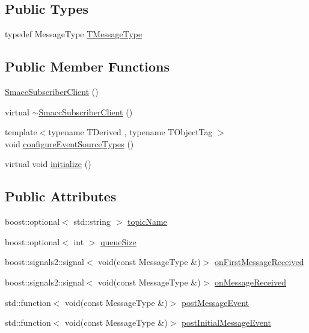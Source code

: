 \subsection*{Public Types}
\begin{DoxyCompactItemize}
\item 
typedef Message\+Type \hyperlink{classsmacc_1_1SmaccSubscriberClient_ae0666debefce5c0e7b355ded711ffa79}{T\+Message\+Type}
\end{DoxyCompactItemize}
\subsection*{Public Member Functions}
\begin{DoxyCompactItemize}
\item 
\hyperlink{classsmacc_1_1SmaccSubscriberClient_a864c5e7a7d267428e971d39b08a75066}{Smacc\+Subscriber\+Client} ()
\item 
virtual \hyperlink{classsmacc_1_1SmaccSubscriberClient_a1cff9c8ba162decf72b951c9e3459b7c}{$\sim$\+Smacc\+Subscriber\+Client} ()
\item 
{\footnotesize template$<$typename T\+Derived , typename T\+Object\+Tag $>$ }\\void \hyperlink{classsmacc_1_1SmaccSubscriberClient_a6bf5d364bc7dc89c4e2ff4796c8e4b63}{configure\+Event\+Source\+Types} ()
\item 
virtual void \hyperlink{classsmacc_1_1SmaccSubscriberClient_acfa97685ecc588fe61eb57002354b58a}{initialize} ()
\end{DoxyCompactItemize}
\subsection*{Public Attributes}
\begin{DoxyCompactItemize}
\item 
boost\+::optional$<$ std\+::string $>$ \hyperlink{classsmacc_1_1SmaccSubscriberClient_ac062907e834aa8e4ca7964fe2035edf7}{topic\+Name}
\item 
boost\+::optional$<$ int $>$ \hyperlink{classsmacc_1_1SmaccSubscriberClient_ac8d4905509ecacb7c93d72c9acb9b6a1}{queue\+Size}
\item 
boost\+::signals2\+::signal$<$ void(const Message\+Type \&)$>$ \hyperlink{classsmacc_1_1SmaccSubscriberClient_a2927ee2e390f12000379c9f48ddb7695}{on\+First\+Message\+Received}
\item 
boost\+::signals2\+::signal$<$ void(const Message\+Type \&)$>$ \hyperlink{classsmacc_1_1SmaccSubscriberClient_a7635fbb013c6fdbc3998da11b44766bb}{on\+Message\+Received}
\item 
std\+::function$<$ void(const Message\+Type \&)$>$ \hyperlink{classsmacc_1_1SmaccSubscriberClient_ac131b24d58ff06791068f8dfd3401a0b}{post\+Message\+Event}
\item 
std\+::function$<$ void(const Message\+Type \&)$>$ \hyperlink{classsmacc_1_1SmaccSubscriberClient_aeec34b082c687a24a89942aca44575cc}{post\+Initial\+Message\+Event}
\end{DoxyCompactItemize}
